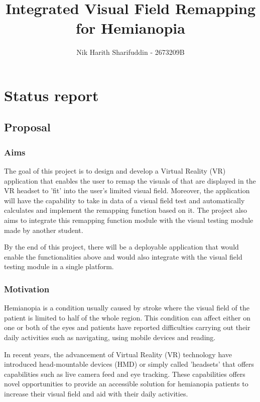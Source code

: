 \documentclass[11pt]{article}
\title{Integrated Visual Field Remapping for Hemianopia}
\author{ {Nik Harith Sharifuddin} - {2673209B }}
\begin{document}
    
    \maketitle
    
    
     

\section{Status report}

\subsection{Proposal}\label{proposal}

\subsubsection{Aims}\label{aims}

The goal of this project is to design and develop a Virtual Reality (VR) application that enables the user to remap the visuals of that are displayed in the VR headset to 'fit' into the user's limited visual field. Moreover, the application will have the capability to take in data of a visual field test and automatically calculates and implement the remapping function based on it. The project also aims to integrate this remapping function module with the visual testing module made by another student.

By the end of this project, there will be a deployable application that would enable the functionalities above and would also integrate with the visual field testing module in a single platform.

\subsubsection{Motivation}\label{motivation}

Hemianopia is a condition usually caused by stroke where the visual field of the patient is limited to half of the whole region. This condition can affect either on one or both of the eyes and patients have reported difficulties carrying out their daily activities such as navigating, using mobile devices and reading.

In recent years, the advancement of Virtual Reality (VR) technology have introduced head-mountable devices (HMD) or simply called 'headsets' that offers capabilities such as live camera feed and eye tracking. These capabilities offers novel opportunities to provide an accessible solution for hemianopia patients to increase their visual field and aid with their daily activities. 
\end{document}
